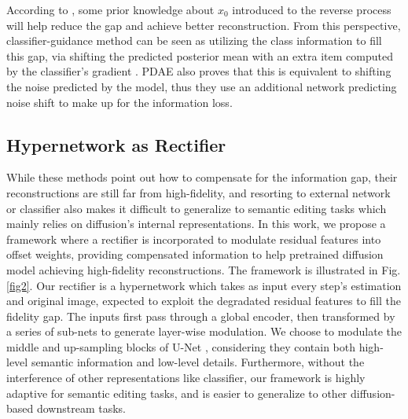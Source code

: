 \documentclass[letterpaper]{article} %
\begin{document}
According to \cite{zhang2022unsupervised}, some prior knowledge about $x_0$ introduced to the reverse process will help reduce the gap and achieve better reconstruction. From this perspective, classifier-guidance \cite{dhariwal2021diffusion} method can be seen as utilizing the class information to fill this gap, via shifting the predicted posterior mean with an extra item computed by the classifier's gradient \cite{zhang2022unsupervised}. PDAE also proves that this is equivalent to shifting the noise predicted by the model, thus they use an additional network predicting noise shift to make up for the information loss.

\subsection{Hypernetwork as Rectifier}
While these methods point out how to compensate for the information gap, their reconstructions are still far from high-fidelity, and resorting to external network or classifier also makes it difficult to generalize to semantic editing tasks which  mainly relies on diffusion's internal representations. In this work, we propose a framework where a rectifier is incorporated to modulate residual features into offset weights, providing compensated information to help pretrained diffusion model achieving high-fidelity reconstructions. The framework is illustrated in Fig. \ref{fig2}.
Our rectifier is a hypernetwork \cite{david2016hypernetworks} which takes as input every step's estimation and original image, expected to exploit the degradated residual features to fill the fidelity gap.
The inputs first pass through a global encoder, then transformed by a series of sub-nets to generate layer-wise modulation.
We choose to modulate the middle and up-sampling blocks of U-Net \cite{ronneberger2015u}, considering they contain both high-level semantic information and low-level details. Furthermore, without the interference of other representations like classifier, our framework is highly adaptive for semantic editing tasks, and is easier to generalize to other diffusion-based downstream tasks.
\end{document}
